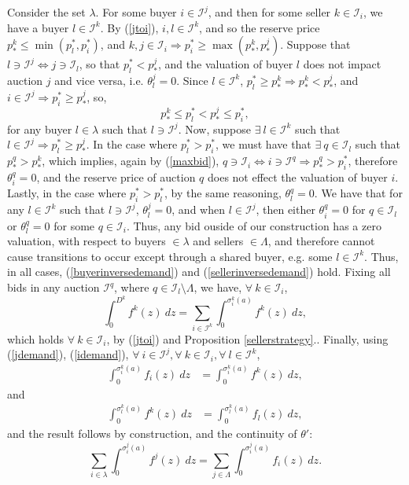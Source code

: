 \documentclass[12pt]{article}
\theoremstyle{definition}
\newcommand{\mcI}{\mathcal{I}}
\newcommand{\g}{\sigma}
\begin{document}
\begin{multicols}{2}
Consider the set $\lambda$. For some buyer $i\in\mcI^j$, and then for
some seller $k \in \mcI_i$, we have a buyer $l \in \mcI^k$. By (\ref{jtoi}), $i,l \in \mcI^k$, and so the reserve price $p_*^k \le \min(p_l^*,
p_i^*)$, and $k, j\in \mcI_i\Rightarrow p_i^* \ge \max(p_*^k, p_*^j)$.
Suppose that $l \ni \mcI^j\Leftrightarrow j \ni \mcI_l$, so
that $p_l^* < p_*^j$, and
the valuation of buyer $l$ does not impact auction $j$ and vice versa, i.e. $\theta_l^j = 0$. Since $l\in\mcI^k$, $p_l^* \ge p_*^k\Rightarrow
p_*^k < p_*^j$, and $i\in\mcI^j \Rightarrow p_i^* \ge p_*^j$, so,
$$
    p_*^k \le p_l^* < p_*^j \le p_i^*,
$$
for any buyer $l\in\lambda$ such that $l\ni \mcI^j$. Now, suppose $\exists \ l\in\mcI^k$ such that $l\in\mcI^j \Rightarrow p_l^* \ge
p_*^j$. In the case where $p_l^* > p_i^*$, we must have that 
$\exists \ q \in \mcI_l$ such that $p_*^q > p_*^k$, %
which implies, again by (\ref{maxbid}), $q\ni\mcI_i \Leftrightarrow i
\ni\mcI^q \Rightarrow p_*^q >
p_i^*$, therefore $\theta_i^q = 0$, and the reserve price of auction $q$ does not effect the valuation of
buyer $i$. 
Lastly, in the case where $p_i^* > p_l^*$, by the same reasoning, $\theta_l^q = 0$.
We have that for any $l\in\mcI^k$ such that $l\ni
\mcI^j$, $\theta_l^j =0$, and when $l\in \mcI^j$, then either $\theta_i^q =0$
for $q\in\mcI_l$ or $\theta_l^q = 0$ for some $q\in\mcI_i$. Thus, any bid ouside of
our construction
has a zero valuation, with respect to buyers $\in\lambda$ and sellers
$\in\Lambda$, and therefore cannot cause transitions to occur except through a
shared buyer, e.g. some $l\in\mcI^k$. Thus, in all cases,
(\ref{buyerinversedemand}) and (\ref{sellerinversedemand}) hold. Fixing all
bids in any auction $\mcI^q$, where $q\in \mcI_l \setminus \Lambda$,
we have, $\forall \ k\in\mcI_i$,
\begin{equation}\label{idemand}
    \displaystyle\int_0^{D^k} f^k(z) \ dz = \sum_{i\in\mcI^k}\int_0^{\g_i^k(a)}
f^k(z) \ dz,
\end{equation}
which holds $\forall \ k\in\mcI_i$, by (\ref{jtoi}) and Proposition
\ref{sellerstrategy}..
Finally, using (\ref{jdemand}), (\ref{idemand}), $\forall \ i\in\mcI^j, \forall \ k\in\mcI_i,\forall \ l\in\mcI^k$,
\begin{align*}
    \int_0^{\g_i^k(a)} f_i(z) \ dz &= \int_0^{\g_i^k(a)} f^k(z) \ dz,
\end{align*}
and
\begin{align*}
    \int_0^{\g_l^k(a)} f^k(z) \ dz &= \int_0^{\g_l^k(a)} f_l(z) \ dz,
\end{align*}
and the result follows by construction, and the continuity of $\theta'$:
\begin{equation}\label{union-eq}
    \sum_{i\in\lambda}\int_0^{\g_i^j(a)} f^j(z) \ dz = \sum_{j\in\Lambda}\int_0^{\g_i^j(a)} f_i(z) \ dz.
\end{equation}


\end{multicols}
\end{document}
